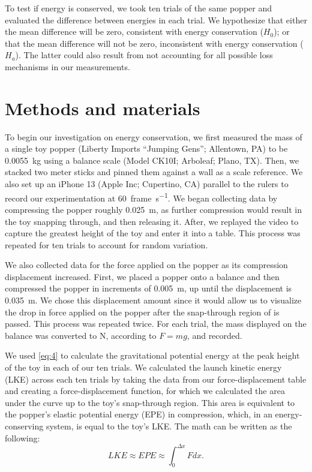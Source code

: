 \documentclass[reprint,amsmath,amssymb,aps,twoside]{revtex4-2} %
\begin{document}
To test if energy is conserved, we took ten trials of the same popper and evaluated the difference between energies in each trial. We hypothesize that either the mean difference will be zero, consistent with energy conservation ($H_0$); or that the mean difference will not be zero, inconsistent with energy conservation ($H_a$). The latter could also result from not accounting for all possible loss mechanisms in our measurements. 







    

\section{Methods and materials}\label{sec:methods}

To begin our investigation on energy conservation, we first measured the mass of a single toy popper (Liberty Imports ``Jumping Gens''; Allentown, PA) to be \qty{0.0055}{\kilo\gram} using a balance scale (Model CK10I; Arboleaf; Plano, TX). Then, we stacked two meter sticks and pinned them against a wall as a scale reference. We also set up an iPhone 13 (Apple Inc; Cupertino, CA) parallel to the rulers to record our experimentation at \qty{60}{frame\per\second}. We began collecting data by compressing the popper roughly \qty{0.025}{\meter}, as further compression would result in the toy snapping through, and then releasing it. After, we replayed the video to capture the greatest height of the toy and enter it into a table. This process was repeated for ten trials to account for random variation.

We also collected data for the force applied on the popper as its compression displacement increased. First, we placed a popper onto a balance and then compressed the popper in increments of \qty{0.005}{\meter}, up until the displacement is \qty{0.035}{\meter}. We chose this displacement amount since it would allow us to visualize the drop in force applied on the popper after the snap-through region of is passed. This process was repeated twice. For each trial, the mass displayed on the balance was converted to \unit{\newton}, according to $F=mg$, and recorded.

We used \cref{eq:4} to calculate the gravitational potential energy at the peak height of the toy in each of our ten trials. We calculated the launch kinetic energy (LKE) across each ten trials by taking the data from our force-displacement table and creating a force-displacement function, for which we calculated the area under the curve up to the toy’s snap-through region. This area is equivalent to the popper’s elastic potential energy (EPE) in compression, which, in an energy-conserving system, is equal to the toy’s LKE. The math can be written as the following:
\begin{equation}
LKE \approx EPE \approx \int_0^{\Delta x} F dx.
\end{equation}
\end{document}
